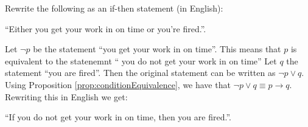 \guard




\begin{exmp}
\label{exmp:conditionalStatementTranslation}
  Rewrite the following as an if-then statement (in English):
  \begin{center}
    ``Either you get your work in on time or you're fired.''.
  \end{center}

  Let $\neg p$ be the statement ``you get your work in on time''.
  This means that $p$ is equivalent to the statenemnt `` you do not get your work in on time''
  Let $q$ the statement ``you are fired''.
  Then the original statement can be written as $\neg p\vee q$.
  Using Proposition \ref{prop:conditionEquivalence}, we have that $\neg p\vee q \equiv p\rightarrow q$.
  Rewriting this in English we get:
  \begin{center}
    ``If you do not get your work in on time, then you are fired.''.
  \end{center}
\end{exmp}
